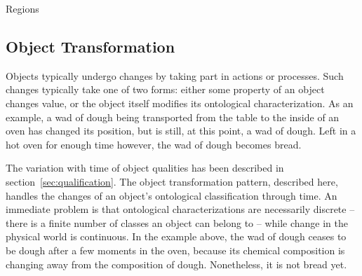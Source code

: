 \begin{ODP}{Regions}
\end{ODP}

\subsection{Object Transformation}
\label{sec:transformation}

Objects typically undergo changes by taking part in actions or processes. Such changes typically take one of two forms: either some property of an object changes value, or the object itself modifies its ontological characterization. As an example, a wad of dough being transported from the table to the inside of an oven has changed its position, but is still, at this point, a wad of dough. Left in a hot oven for enough time however, the wad of dough becomes bread.

The variation with time of object qualities has been described in section~\ref{sec:qualification}. The object transformation pattern, described here, handles the changes of an object's ontological classification through time. An immediate problem is that ontological characterizations are necessarily discrete -- there is a finite number of classes an object can belong to -- while change in the physical world is continuous. In the example above, the wad of dough ceases to be dough after a few moments in the oven, because its chemical composition is changing away from the composition of dough. Nonetheless, it is not bread yet.

